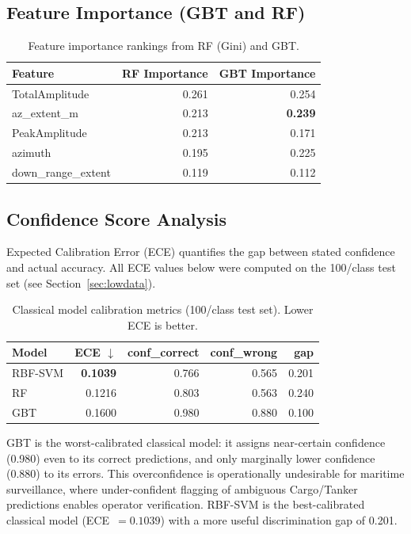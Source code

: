 \documentclass[journal]{IEEEtran}
\begin{document}
\subsection{Feature Importance (GBT and RF)}

\begin{table}[H]
\centering
\caption{Feature importance rankings from RF (Gini) and GBT.}
\begin{tabular}{lrr}
\toprule
\textbf{Feature} & \textbf{RF Importance} & \textbf{GBT Importance} \\
\midrule
TotalAmplitude      & 0.261 & 0.254 \\
az\_extent\_m       & 0.213 & \textbf{0.239} \\
PeakAmplitude       & 0.213 & 0.171 \\
azimuth             & 0.195 & 0.225 \\
down\_range\_extent & 0.119 & 0.112 \\
\bottomrule
\end{tabular}
\end{table}

\subsection{Confidence Score Analysis}

Expected Calibration Error (ECE) quantifies the gap between stated confidence
and actual accuracy. All ECE values below were computed on the 100/class test
set (see Section~\ref{sec:lowdata}).

\begin{table}[H]
\centering
\caption{Classical model calibration metrics (100/class test set).
         Lower ECE is better.}
\begin{tabular}{lrrrr}
\toprule
\textbf{Model} & \textbf{ECE} $\downarrow$ & \textbf{conf\_correct} & \textbf{conf\_wrong} & \textbf{gap} \\
\midrule
RBF-SVM & \textbf{0.1039} & 0.766 & 0.565 & 0.201 \\
RF      & 0.1216          & 0.803 & 0.563 & 0.240 \\
GBT     & 0.1600          & 0.980 & 0.880 & 0.100 \\
\bottomrule
\end{tabular}
\end{table}

\noindent GBT is the worst-calibrated classical model: it assigns near-certain
confidence (0.980) even to its correct predictions, and only marginally lower
confidence (0.880) to its errors. This overconfidence is operationally
undesirable for maritime surveillance, where under-confident flagging of
ambiguous Cargo/Tanker predictions enables operator verification. RBF-SVM
is the best-calibrated classical model (ECE~$= 0.1039$) with a more useful
discrimination gap of 0.201.
\end{document}
